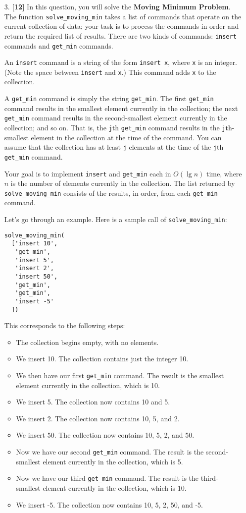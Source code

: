 \documentclass{assignment-263}
\begin{document}
\begin{enumerate}
\item[3.] \textbf{[12]} 
In this question, you will solve the {\bf Moving Minimum Problem}. The function \verb|solve_moving_min| takes a list of commands that operate on the current collection of data; your task is to process the commands in order and return the required list of results. There are two kinds of commands: \verb|insert| commands and \verb|get_min| commands.

An \verb|insert| command is a string of the form \verb|insert x|, where \verb|x| is an integer. (Note the space between \verb|insert| and \verb|x|.) This command adds \verb|x| to the collection.

A \verb|get_min| command is simply the string \verb|get_min|. The first \verb|get_min| command results in the smallest element currently in the collection; the next \verb|get_min| command results in the second-smallest element currently in the collection; and so on. That is, the \verb|j|th \verb|get_min| command results in the \verb|j|th-smallest element in the collection at the time of the command. You can assume that the collection has at least \verb|j| elements at the time of the \verb|j|th \verb|get_min| command.

Your goal is to implement \verb|insert| and \verb|get_min| each in $O(\lg n)$ time, where $n$ is the number of elements currently in the collection. The list returned by \verb|solve_moving_min| consists of the results, in order, from each \verb|get_min| command.

Let's go through an example. Here is a sample call of \verb|solve_moving_min|:

\begin{verbatim}
solve_moving_min(
  ['insert 10',
   'get_min',
   'insert 5',
   'insert 2',
   'insert 50',
   'get_min',
   'get_min',
   'insert -5'
  ])
\end{verbatim}

This corresponds to the following steps:
\begin{itemize}
\item The collection begins empty, with no elements.
\item We insert 10. The collection contains just the integer 10.
\item We then have our first \verb|get_min| command. The result is the smallest element currently in the collection, which is 10.
\item We insert 5. The collection now contains 10 and 5.
\item We insert 2. The collection now contains 10, 5, and 2.
\item We insert 50. The collection now contains 10, 5, 2, and 50.
\item Now we have our second \verb|get_min| command. The result is the second-smallest element currently in the collection, which is 5.
\item Now we have our third \verb|get_min| command. The result is the third-smallest element currently in the collection, which is 10.
\item We insert -5. The collection now contains 10, 5, 2, 50, and -5.
\end{itemize}


\end{enumerate}
\end{document}
